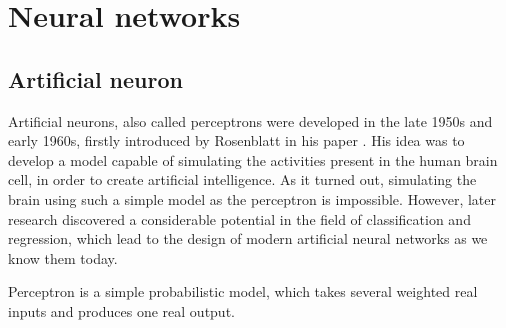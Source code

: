 \chapter{Neural networks}
\label{chapter-ml}

\section{Artificial neuron}

Artificial neurons, also called perceptrons were developed in the late 1950s and early 1960s, firstly introduced by Rosenblatt in his paper \cite{perceptron}. His idea was to develop a model capable of simulating the activities present in the human brain cell, in order to create artificial intelligence. As it turned out, simulating the brain using such a simple model as the perceptron is impossible. However, later research discovered a considerable potential in the field of classification and regression, which lead to the design of modern artificial neural networks as we know them today.

Perceptron \cite{nn_book} is a simple probabilistic model, which takes several weighted real inputs and produces one real output.

\vspace{3mm}

